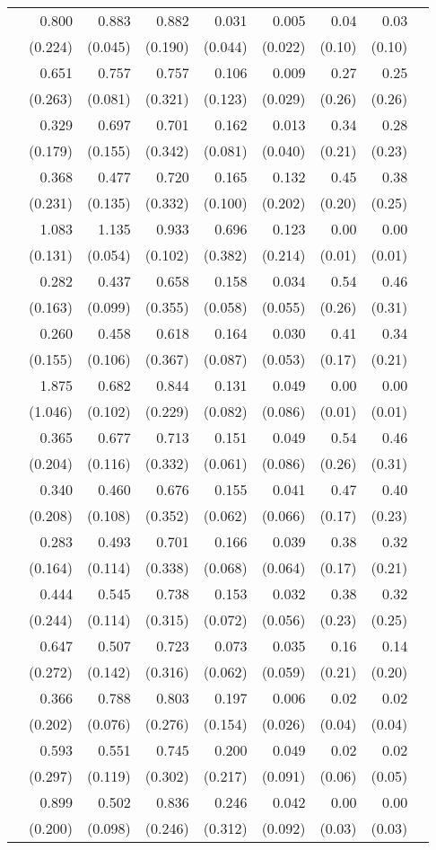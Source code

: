 \begin{longtable}{rrrrrrrrr}
\addlinespace[0.05cm] 80&0.800&0.883&0.882&0.031&0.005&0.04&0.03\\&(0.224)&(0.045)&(0.190)&(0.044)&(0.022)&(0.10)&(0.10) \\ \addlinespace[0.05cm] 81&0.651&0.757&0.757&0.106&0.009&0.27&0.25\\&(0.263)&(0.081)&(0.321)&(0.123)&(0.029)&(0.26)&(0.26) \\ \addlinespace[0.05cm] 82&0.329&0.697&0.701&0.162&0.013&0.34&0.28\\&(0.179)&(0.155)&(0.342)&(0.081)&(0.040)&(0.21)&(0.23) \\ \addlinespace[0.05cm] 83&0.368&0.477&0.720&0.165&0.132&0.45&0.38\\&(0.231)&(0.135)&(0.332)&(0.100)&(0.202)&(0.20)&(0.25) \\ \addlinespace[0.05cm] 84&1.083&1.135&0.933&0.696&0.123&0.00&0.00\\&(0.131)&(0.054)&(0.102)&(0.382)&(0.214)&(0.01)&(0.01) \\ \addlinespace[0.05cm] 85&0.282&0.437&0.658&0.158&0.034&0.54&0.46\\&(0.163)&(0.099)&(0.355)&(0.058)&(0.055)&(0.26)&(0.31) \\ \addlinespace[0.05cm] 86&0.260&0.458&0.618&0.164&0.030&0.41&0.34\\&(0.155)&(0.106)&(0.367)&(0.087)&(0.053)&(0.17)&(0.21) \\ \addlinespace[0.05cm] 87&1.875&0.682&0.844&0.131&0.049&0.00&0.00\\&(1.046)&(0.102)&(0.229)&(0.082)&(0.086)&(0.01)&(0.01) \\ \addlinespace[0.05cm] 88&0.365&0.677&0.713&0.151&0.049&0.54&0.46\\&(0.204)&(0.116)&(0.332)&(0.061)&(0.086)&(0.26)&(0.31) \\ \addlinespace[0.05cm] 89&0.340&0.460&0.676&0.155&0.041&0.47&0.40\\&(0.208)&(0.108)&(0.352)&(0.062)&(0.066)&(0.17)&(0.23) \\ \addlinespace[0.05cm] 90&0.283&0.493&0.701&0.166&0.039&0.38&0.32\\&(0.164)&(0.114)&(0.338)&(0.068)&(0.064)&(0.17)&(0.21) \\ \addlinespace[0.05cm] 91&0.444&0.545&0.738&0.153&0.032&0.38&0.32\\&(0.244)&(0.114)&(0.315)&(0.072)&(0.056)&(0.23)&(0.25) \\ \addlinespace[0.05cm] 92&0.647&0.507&0.723&0.073&0.035&0.16&0.14\\&(0.272)&(0.142)&(0.316)&(0.062)&(0.059)&(0.21)&(0.20) \\ \addlinespace[0.05cm] 93&0.366&0.788&0.803&0.197&0.006&0.02&0.02\\&(0.202)&(0.076)&(0.276)&(0.154)&(0.026)&(0.04)&(0.04) \\ \addlinespace[0.05cm] 94&0.593&0.551&0.745&0.200&0.049&0.02&0.02\\&(0.297)&(0.119)&(0.302)&(0.217)&(0.091)&(0.06)&(0.05) \\ \addlinespace[0.05cm] 95&0.899&0.502&0.836&0.246&0.042&0.00&0.00\\&(0.200)&(0.098)&(0.246)&(0.312)&(0.092)&(0.03)&(0.03) \\ 
\end{longtable}
